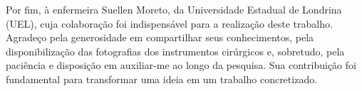 \begin{flushleft}
{Por fim, à enfermeira Suellen Moreto, da Universidade Estadual de Londrina (UEL), cuja colaboração foi indispensável para a realização deste trabalho. Agradeço pela generosidade em compartilhar seus conhecimentos, pela disponibilização das fotografias dos instrumentos cirúrgicos e, sobretudo, pela paciência e disposição em auxiliar-me ao longo da pesquisa. Sua contribuição foi fundamental para transformar uma ideia em um trabalho concretizado.
\vspace{11pt}

}
\end{flushleft}
